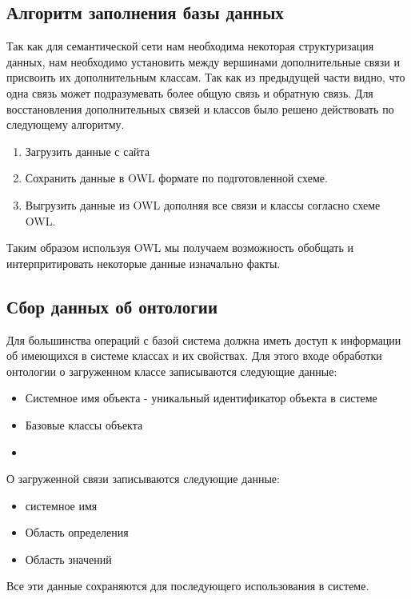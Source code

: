 \subsection{Алгоритм заполнения базы данных}
Так как для семантической сети нам необходима некоторая структуризация данных, нам необходимо установить между вершинами дополнительные связи и присвоить их дополнительным классам. Так как из предыдущей части видно, что одна связь может подразумевать более общую связь и обратную связь.
Для восстановления дополнительных связей и классов было решено действовать по следующему алгоритму.
\begin{enumerate}
\item Загрузить данные с сайта
\item Сохранить данные в OWL формате по подготовленной схеме.
\item Выгрузить данные из OWL дополняя все связи и классы согласно схеме OWL.
\end{enumerate}
Таким образом используя OWL мы получаем возможность обобщать и интерпритировать некоторые данные изначально факты.
\subsection{Сбор данных об онтологии}
Для большинства операций с базой система должна иметь доступ к информации об имеющихся в системе классах и их свойствах. 
Для этого входе обработки онтологии о загруженном классе записываются следующие данные:
\begin{itemize}
\item Системное имя объекта - уникальный идентификатор объекта в системе
\item Базовые классы объекта
\item 
\end{itemize}
О загруженной связи записываются следующие данные:
\begin{itemize}
\item системное имя
\item Область определения
\item Область значений
\end{itemize}
Все эти данные сохраняются для последующего использования в системе.
